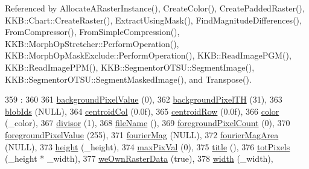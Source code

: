 Referenced by Allocate\+A\+Raster\+Instance(), Create\+Color(), Create\+Padded\+Raster(), K\+K\+B\+::\+Chart\+::\+Create\+Raster(), Extract\+Using\+Mask(), Find\+Magnitude\+Differences(), From\+Compressor(), From\+Simple\+Compression(), K\+K\+B\+::\+Morph\+Op\+Stretcher\+::\+Perform\+Operation(), K\+K\+B\+::\+Morph\+Op\+Mask\+Exclude\+::\+Perform\+Operation(), K\+K\+B\+::\+Read\+Image\+P\+G\+M(), K\+K\+B\+::\+Read\+Image\+P\+P\+M(), K\+K\+B\+::\+Segmentor\+O\+T\+S\+U\+::\+Segment\+Image(), K\+K\+B\+::\+Segmentor\+O\+T\+S\+U\+::\+Segment\+Masked\+Image(), and Transpose().


\begin{DoxyCode}
359                 :
360 
361   \hyperlink{class_k_k_b_1_1_raster_ab7ed2191cce116a6a37029dc6e3713ef}{backgroundPixelValue} (0),
362   \hyperlink{class_k_k_b_1_1_raster_a3c4e96eaf48274f5d8912617f81f2a0b}{backgroundPixelTH}    (31),
363   \hyperlink{class_k_k_b_1_1_raster_a0fc9a1588e809db0b701f0a886bfd18c}{blobIds}              (NULL),
364   \hyperlink{class_k_k_b_1_1_raster_ac4cb3984d20f6eef6fd4f201681ea1d5}{centroidCol}          (0.0f),
365   \hyperlink{class_k_k_b_1_1_raster_a3380e5734ec57a147e36c734cc83c5ff}{centroidRow}          (0.0f),
366   \hyperlink{class_k_k_b_1_1_raster_a482384d89cc53fa4f36276307c746854}{color}                (\_color),
367   \hyperlink{class_k_k_b_1_1_raster_afaaaf54fd824a4a47fba97f7fba9398f}{divisor}              (1),
368   \hyperlink{class_k_k_b_1_1_raster_a742e1da027493443f2dda570a89fe2e9}{fileName}             (),
369   \hyperlink{class_k_k_b_1_1_raster_aa7e86253f4b9c347da718732e44b60e8}{foregroundPixelCount} (0),
370   \hyperlink{class_k_k_b_1_1_raster_ac9a5cec097e9fed669fe3c44bcc1678c}{foregroundPixelValue} (255),
371   \hyperlink{class_k_k_b_1_1_raster_a16d18df2f29a49c7a8ee670e0ea0c3a9}{fourierMag}           (NULL),
372   \hyperlink{class_k_k_b_1_1_raster_adc50969a106f5b57aca3a9ce512df0ce}{fourierMagArea}       (NULL),
373   \hyperlink{class_k_k_b_1_1_raster_af39ff189de4fbb6de98392e187efafb7}{height}               (\_height),
374   \hyperlink{class_k_k_b_1_1_raster_a4f37d3b83826f522f61af0918a1d5546}{maxPixVal}            (0),
375   \hyperlink{class_k_k_b_1_1_raster_a2dc74728363b538563b6626422651236}{title}                (),
376   \hyperlink{class_k_k_b_1_1_raster_a9b08c4a0ca0a35435a478599635f1dc0}{totPixels}            (\_height * \_width),
377   \hyperlink{class_k_k_b_1_1_raster_a3f960c2c781707efa7942d4fd2065e52}{weOwnRasterData}      (\textcolor{keyword}{true}),
378   \hyperlink{class_k_k_b_1_1_raster_ae0bcc103e191c3421d7692dc69ceb554}{width}                (\_width),

\end{DoxyCode}
